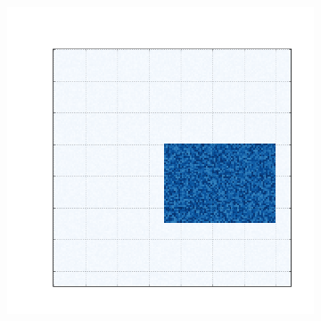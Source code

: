 \documentclass[
    12pt,                %
    oneside,            %
    a4paper,            %
    english,            %
    brazil                %
    ]{abntex2ppgsi}
\begin{document}
\begin{figure} [htpb]
\centering
 \caption{
        Dados sintéticos gerados a partir das diferentes estruturas de cogrupos.
        (a) Um único cogrupo.
        (b) Cogrupos com linhas e colunas sem sobreposição.
        (c) Cogrupos com estrutura em xadrez.  %
        (d) Cogrupos sem sobreposição nas linhas e com sobreposição nas colunas.
        (e) Cogrupos com sobreposição nas linhas e sem sobreposição nas colunas.
    }
    \begin{subfigure}[b]{0.18\textwidth}
        \includegraphics[width=\textwidth]{img/a-bic-structure.png}
        \caption{}
        \label{fig:bic-syntetic-structure:a}
    \end{subfigure}
    ~
    \begin{subfigure}[b]{0.18\textwidth}

\end{subfigure}
\end{figure}
\end{document}
